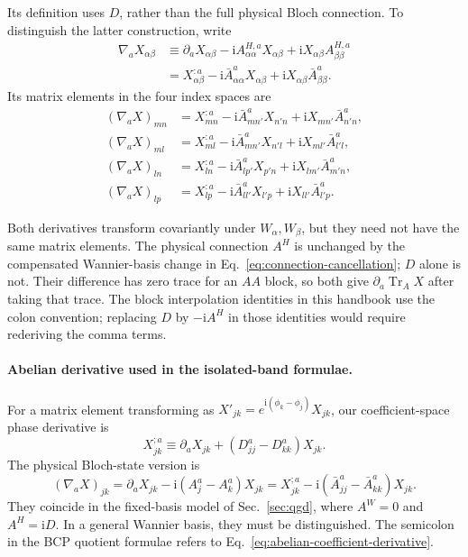\documentclass[prx,amsmath,amssymb,superscriptaddress,longbibliography]{revtex4-2}
\newcommand{\Tr}{\operatorname{Tr}}
\newcommand{\ii}{\mathrm{i}}
\begin{document}
Its definition uses $D$, rather than the full physical Bloch connection.
To distinguish the latter construction, write
\begin{align}
 \nabla_a X_{\alpha\beta}
 &\equiv\partial_aX_{\alpha\beta}-\ii A^{H,a}_{\alpha\alpha}X_{\alpha\beta}
                           +\ii X_{\alpha\beta}A^{H,a}_{\beta\beta}
 \nonumber\\
 &=X_{\alpha\beta}^{:a}-\ii\bar A^a_{\alpha\alpha}X_{\alpha\beta}+\ii X_{\alpha\beta}\bar A^a_{\beta\beta}.
 \label{eq:physical-covariant-derivative}
\end{align}
Its matrix elements in the four index spaces are
\begin{align}
 (\nabla_aX)_{mn}&=X_{mn}^{:a}-\ii\bar A_{mn'}^aX_{n'n}+\ii X_{mn'}\bar A_{n'n}^a,\nonumber\\
 (\nabla_aX)_{ml}&=X_{ml}^{:a}-\ii\bar A_{mn'}^aX_{n'l}+\ii X_{ml'}\bar A_{l'l}^a,\nonumber\\
 (\nabla_aX)_{ln}&=X_{ln}^{:a}-\ii\bar A_{lp'}^aX_{p'n}+\ii X_{lm'}\bar A_{m'n}^a,\nonumber\\
 (\nabla_aX)_{lp}&=X_{lp}^{:a}-\ii\bar A_{ll'}^aX_{l'p}+\ii X_{ll'}\bar A_{l'p}^a.
 \label{eq:physical-derivative-components}
\end{align}

Both derivatives transform covariantly under $W_\alpha,W_\beta$, but they need not
have the same matrix elements. The physical connection $A^H$ is unchanged
by the compensated Wannier-basis change in Eq.~\eqref{eq:connection-cancellation};
$D$ alone is not. Their difference has zero trace for an $AA$ block,
so both give $\partial_a\Tr_A X$ after taking that trace.
The block interpolation identities in this handbook use the colon convention;
replacing $D$ by $-\ii A^H$ in those identities would require rederiving the comma terms.

\paragraph{Abelian derivative used in the isolated-band formulae.}
For a matrix element transforming as $X'_{jk}=e^{\ii(\phi_k-\phi_j)}X_{jk}$,
our coefficient-space phase derivative is
\begin{equation}
 X_{jk}^{;a}\equiv\partial_a X_{jk}
 +(D_{jj}^a-D_{kk}^a)X_{jk}.
 \label{eq:abelian-coefficient-derivative}
\end{equation}
The physical Bloch-state version is
\begin{equation}
 (\nabla_a X)_{jk}=\partial_aX_{jk}-\ii(A_j^a-A_k^a)X_{jk}
 =X_{jk}^{;a}-\ii(\bar A_{jj}^a-\bar A_{kk}^a)X_{jk}.
 \label{eq:abelian-physical-derivative}
\end{equation}
They coincide in the fixed-basis model of Sec.~\ref{sec:qgd}, where
$A^W=0$ and $A^H=\ii D$. In a general Wannier basis, they must be distinguished.
The semicolon in the BCP quotient formulae refers to
Eq.~\eqref{eq:abelian-coefficient-derivative}.
\end{document}
